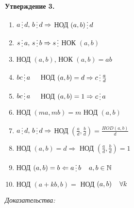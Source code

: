 \documentclass[12pt]{article}
\begin{document}
\textbf{Утверждение 3.}\par
\begin{enumerate}
    \item $a \mathop{\raisebox{-2pt}{\vdots}} d , \, b \mathop{\raisebox{-2pt}{\vdots}} d \Rightarrow$ НОД $(a,b) \mathop{\raisebox{-2pt}{\vdots}} d$
    \item $s \mathop{\raisebox{-2pt}{\vdots}} a , \, s \mathop{\raisebox{-2pt}{\vdots}} b \Rightarrow s \mathop{\raisebox{-2pt}{\vdots}}$ НОК $(a,b)$
    \item НОД $(a,b)$, НОК $(a,b) = ab$
    \item $bc \mathop{\raisebox{-2pt}{\vdots}} a \hspace{4 mm}$ НОД $(a,b)=d \Rightarrow c \mathop{\raisebox{-2pt}{\vdots}} \frac{a}{d}$
    \item $bc \mathop{\raisebox{-2pt}{\vdots}} a \hspace{4 mm}$ НОД $(a,b)=1 \Rightarrow c \mathop{\raisebox{-2pt}{\vdots}} a$
    \item НОД $(ma, mb) = m$ НОД $(a,b)$
    \item $a \mathop{\raisebox{-2pt}{\vdots}} d, \, b \mathop{\raisebox{-2pt}{\vdots}} d \Rightarrow$ НОД $(\frac{a}{d}, \frac{b}{d}) = \frac{HOD(a,b)}{d}$
    \item НОД $(a,b) = d \Rightarrow$ НОД $(\frac{a}{d}, \frac{b}{d})=1$
    \item НОД $(a,b)=b \Leftarrow a \mathop{\raisebox{-2pt}{\vdots}} b \hspace{4 mm} a,b \in \mathbb{N}$
    \item НОД $(a+kb,b) =$ НОД $(a,b) \hspace{4 mm} \forall k$
\end{enumerate}\par
\textit{Доказательства:}\par
\end{document}
